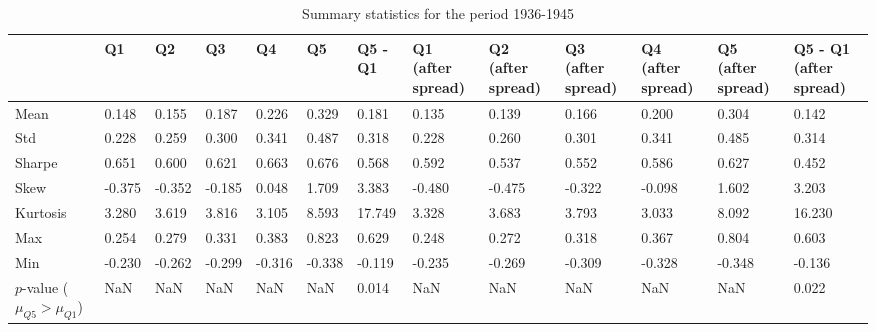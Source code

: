 \begin{table}
\caption{Summary statistics for the period 1936-1945}
\label{tab:summary_1936_1945}
\begin{tabular}{lllllllllllll}
\toprule
 & Q1 & Q2 & Q3 & Q4 & Q5 & Q5 - Q1 & Q1 (after spread) & Q2 (after spread) & Q3 (after spread) & Q4 (after spread) & Q5 (after spread) & Q5 - Q1 (after spread) \\
\midrule
Mean & 0.148 & 0.155 & 0.187 & 0.226 & 0.329 & 0.181 & 0.135 & 0.139 & 0.166 & 0.200 & 0.304 & 0.142 \\
Std & 0.228 & 0.259 & 0.300 & 0.341 & 0.487 & 0.318 & 0.228 & 0.260 & 0.301 & 0.341 & 0.485 & 0.314 \\
Sharpe & 0.651 & 0.600 & 0.621 & 0.663 & 0.676 & 0.568 & 0.592 & 0.537 & 0.552 & 0.586 & 0.627 & 0.452 \\
Skew & -0.375 & -0.352 & -0.185 & 0.048 & 1.709 & 3.383 & -0.480 & -0.475 & -0.322 & -0.098 & 1.602 & 3.203 \\
Kurtosis & 3.280 & 3.619 & 3.816 & 3.105 & 8.593 & 17.749 & 3.328 & 3.683 & 3.793 & 3.033 & 8.092 & 16.230 \\
Max & 0.254 & 0.279 & 0.331 & 0.383 & 0.823 & 0.629 & 0.248 & 0.272 & 0.318 & 0.367 & 0.804 & 0.603 \\
Min & -0.230 & -0.262 & -0.299 & -0.316 & -0.338 & -0.119 & -0.235 & -0.269 & -0.309 & -0.328 & -0.348 & -0.136 \\
$p$-value ($\mu_{Q5} > \mu_{Q1}$) & NaN & NaN & NaN & NaN & NaN & 0.014 & NaN & NaN & NaN & NaN & NaN & 0.022 \\
\bottomrule
\end{tabular}
\end{table}

